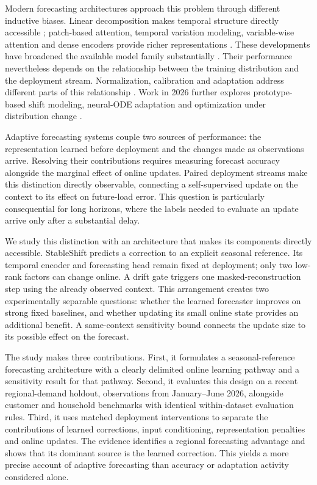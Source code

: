\documentclass[final,5p,times]{elsarticle}
\begin{document}
Modern forecasting architectures approach this problem through different inductive biases. Linear decomposition makes temporal structure directly accessible \cite{zeng2023transformers}; patch-based attention, temporal variation modeling, variable-wise attention and dense encoders provide richer representations \cite{nie2023patchtst,wu2023timesnet,liu2023itransformer,das2023tide}. These developments have broadened the available model family substantially \cite{liao2026survey}. Their performance nevertheless depends on the relationship between the training distribution and the deployment stream. Normalization, calibration and adaptation address different parts of this relationship \cite{liu2022nonstationary,fan2023dishts,chen2024calibration}. Work in 2026 further explores prototype-based shift modeling, neural-ODE adaptation and optimization under distribution change \cite{apt2026,adanodes2026,adamshift2026}.

Adaptive forecasting systems couple two sources of performance: the representation learned before deployment and the changes made as observations arrive. Resolving their contributions requires measuring forecast accuracy alongside the marginal effect of online updates. Paired deployment streams make this distinction directly observable, connecting a self-supervised update on the context to its effect on future-load error. This question is particularly consequential for long horizons, where the labels needed to evaluate an update arrive only after a substantial delay.

We study this distinction with an architecture that makes its components directly accessible. StableShift predicts a correction to an explicit seasonal reference. Its temporal encoder and forecasting head remain fixed at deployment; only two low-rank factors can change online. A drift gate triggers one masked-reconstruction step using the already observed context. This arrangement creates two experimentally separable questions: whether the learned forecaster improves on strong fixed baselines, and whether updating its small online state provides an additional benefit. A same-context sensitivity bound connects the update size to its possible effect on the forecast.

The study makes three contributions. First, it formulates a seasonal-reference forecasting architecture with a clearly delimited online learning pathway and a sensitivity result for that pathway. Second, it evaluates this design on a recent regional-demand holdout, observations from January--June 2026, alongside customer and household benchmarks with identical within-dataset evaluation rules. Third, it uses matched deployment interventions to separate the contributions of learned corrections, input conditioning, representation penalties and online updates. The evidence identifies a regional forecasting advantage and shows that its dominant source is the learned correction. This yields a more precise account of adaptive forecasting than accuracy or adaptation activity considered alone.
\end{document}
